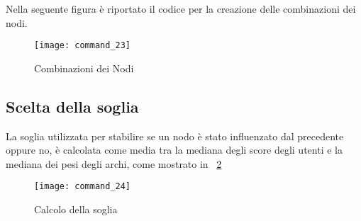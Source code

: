 Nella seguente figura è riportato il codice per la creazione delle combinazioni dei
nodi.
\begin{figure}[!htbp]
  \texttt{[image: command\_23]}
  \caption{Combinazioni dei Nodi}
  \label{command_23}
\end{figure}
\clearpage

\subsection{Scelta della soglia}
La soglia utilizzata per stabilire se un nodo è stato influenzato dal precedente
oppure no, è calcolata come media tra la mediana degli score degli utenti e la
mediana dei pesi degli archi, come mostrato in \figurename~\ref{command_24}

\begin{figure}[!htbp]
  \texttt{[image: command\_24]}
  \caption{Calcolo della soglia}
  \label{command_24}
\end{figure}
\clearpage

